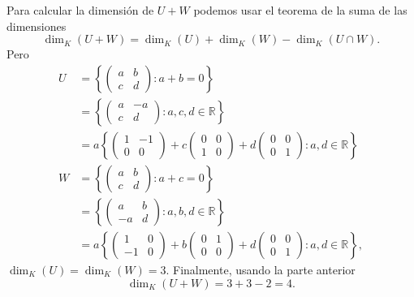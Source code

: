 \documentclass[a4paper]{article}
\theoremstyle{exampstyle}
\theoremstyle{definition}
\begin{document}
\begin{enumerate}
\begin{enumerate}
Para calcular la dimensi\'on de $U+W$ podemos usar el teorema de la suma de las dimensiones
\[\dim_K(U+ W)=\dim_K(U)+\dim_K(W)-\dim_K(U\cap W).\]
Pero
    \begin{align*}
        U &=\left\{\begin{pmatrix} a & b \\ c & d \end{pmatrix}\colon a+b=0 \right\}\\&=\left\{\begin{pmatrix} a & -a \\ c & d \end{pmatrix}\colon a,c,d\in \mathbb{R}\right\}\\
        &=a\left\{\begin{pmatrix} 1 & -1 \\ 0 & 0 \end{pmatrix}+c\begin{pmatrix} 0 & 0 \\ 1 & 0 \end{pmatrix}+d\begin{pmatrix} 0 & 0 \\ 0 & 1 \end{pmatrix}\colon a,d\in \mathbb{R}\right\}\\
        W&=\left\{\begin{pmatrix} a & b \\ c & d \end{pmatrix}\colon  a+c=0\right\}\\&=\left\{\begin{pmatrix} a & b \\ -a & d \end{pmatrix}\colon a,b,d\in \mathbb{R}\right\}\\
        &=a\left\{\begin{pmatrix} 1 & 0 \\ -1 & 0 \end{pmatrix}+b\begin{pmatrix} 0 & 1 \\ 0 & 0 \end{pmatrix}+d\begin{pmatrix} 0 & 0 \\ 0 & 1 \end{pmatrix}\colon a,d\in \mathbb{R}\right\},
    \end{align*}
$\dim_K(U)=\dim_K(W)=3$. Finalmente, usando la parte anterior
    \[\dim_K(U+ W)=3+3-2=4.\]
\end{enumerate}



\end{enumerate}
\end{document}
